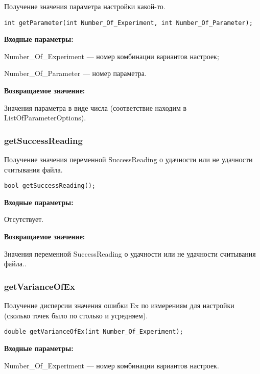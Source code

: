 \documentclass[a4paper,12pt]{article}
\begin{document}
Получение значения параметра настройки какой-то.


\begin{lstlisting}[label=code_syntax_getParameter,caption=Синтаксис]
int getParameter(int Number_Of_Experiment, int Number_Of_Parameter);
\end{lstlisting}

\textbf{Входные параметры:}

Number\_Of\_Experiment --- номер комбинации вариантов настроек;
 
Number\_Of\_Parameter --- номер параметра.

\textbf{Возвращаемое значение:}

Значения параметра в виде числа (соответствие находим в ListOfParameterOptions).


\subsubsection{getSuccessReading}\label{getSuccessReading}

Получение значения переменной SuccessReading о удачности или не удачности считывания файла.


\begin{lstlisting}[label=code_syntax_getSuccessReading,caption=Синтаксис]
bool getSuccessReading();
\end{lstlisting}

\textbf{Входные параметры:}

Отсутствует.

\textbf{Возвращаемое значение:}

Значения переменной SuccessReading о удачности или не удачности считывания файла..


\subsubsection{getVarianceOfEx}\label{getVarianceOfEx}

Получение дисперсии значения ошибки Ex по измерениям для настройки (сколько точек было по столько и усредняем).


\begin{lstlisting}[label=code_syntax_getVarianceOfEx,caption=Синтаксис]
double getVarianceOfEx(int Number_Of_Experiment);
\end{lstlisting}

\textbf{Входные параметры:}

Number\_Of\_Experiment --- номер комбинации вариантов настроек.
\end{document}
